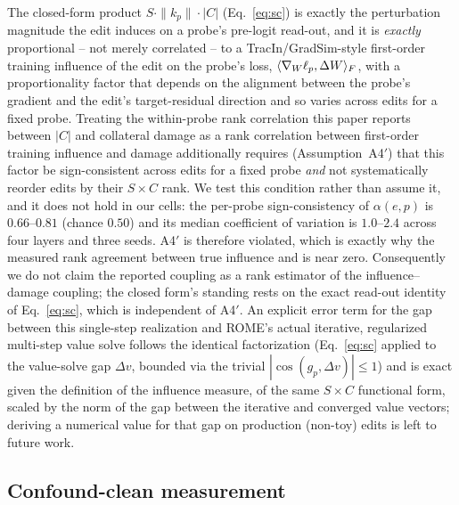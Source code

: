 \begin{remark}
The closed-form product $S\cdot\|k_p\|\cdot|C|$ (Eq.~\ref{eq:sc}) is exactly the
perturbation magnitude the edit induces on a probe's pre-logit read-out, and it is
\emph{exactly} proportional -- not merely correlated -- to a TracIn/GradSim-style
first-order training influence of the edit on the probe's loss,
$\langle\nabla_W\ell_p,\Delta W\rangle_F$, with a proportionality factor that depends on the
alignment between the probe's gradient and the edit's target-residual direction and so
varies across edits for a fixed probe. Treating the within-probe rank correlation this
paper reports between $|C|$ and collateral damage as a rank correlation between
first-order training influence and damage additionally requires (Assumption~A4$'$) that
this factor be sign-consistent across edits for a fixed probe \emph{and} not
systematically reorder edits by their $S\times C$ rank. We test this condition
rather than assume it, and it does not hold in our cells: the per-probe
sign-consistency of $\alpha(e,p)$ is $0.66$--$0.81$ (chance $0.50$) and its
median coefficient of variation is $1.0$--$2.4$ across four layers and three seeds.
A4$'$ is therefore violated, which is exactly why the measured rank agreement
between true influence and \SxC{} is near zero. Consequently we do not claim
the reported coupling as a rank estimator of the influence--damage coupling;
the closed form's standing rests on the exact read-out identity of
Eq.~\ref{eq:sc}, which is independent of A4$'$. An explicit error term for the gap between this single-step
realization and ROME's actual iterative, regularized multi-step value solve follows the
identical factorization (Eq.~\ref{eq:sc} applied to the value-solve gap $\Delta v$,
bounded via the trivial $|\cos(g_p,\Delta v)|\le 1$) and is exact given the definition of
the influence measure, of the same $S\times C$ functional form, scaled by the norm of the
gap between the iterative and converged value vectors; deriving a numerical value for that
gap on production (non-toy) edits is left to future work.
\end{remark}
\fi

\subsection{Confound-clean measurement}
\label{sec:gate}

